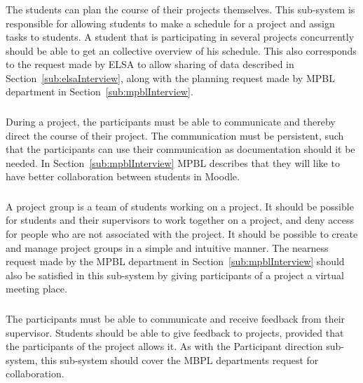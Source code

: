 \subsubsection{\timelinegroup{}} %
The students can plan the course of their projects themselves.
This sub-system is responsible for allowing students to make a schedule for a project and assign tasks to students.
A student that is participating in several projects concurrently should be able to get an collective overview of his schedule.
This also corresponds to the request made by ELSA to allow sharing of data described in Section~\ref{sub:elsaInterview}, along with the planning request made by MPBL department in Section~\ref{sub:mpblInterview}.

\subsubsection{\blackboardgroup{}} %
During a project, the participants must be able to communicate and thereby direct the course of their project.
The communication must be persistent, such that the participants can use their communication as documentation should it be needed.
In Section~\ref{sub:mpblInterview} MPBL describes that they will like to have better collaboration between students in Moodle.

\subsubsection{\administrationgroup{}} %
A project group is a team of students working on a project.
It should be possible for students and their supervisors to work together on a project, and deny access for people who are not associated with the project.
It should be possible to create and manage project groups in a simple and intuitive manner.
The nearness request made by the MPBL department in Section~\ref{sub:mpblInterview} should also be satisfied in this sub-system by giving participants of a project a virtual meeting place.

\subsubsection{\supervisorgroup{}} %
The participants must be able to communicate and receive feedback from their supervisor.
Students should be able to give feedback to projects, provided that the participants of the project allows it.
As with the Participant direction sub-system, this sub-system should cover the MBPL departments request for collaboration.


